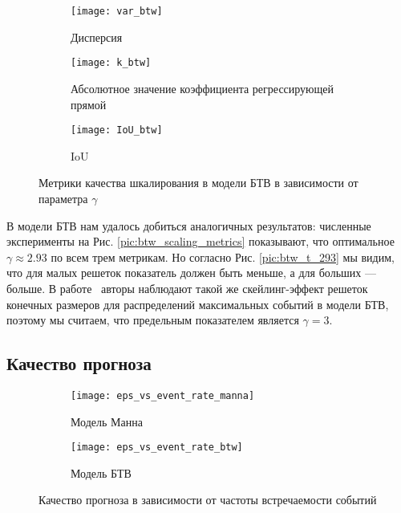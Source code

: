 \begin{figure}[h]
	\centering
	\centering
	\hspace{-25mm}
	\begin{subfigure}[t]{0.27\textwidth}
		\centering
		\texttt{[image: var\_btw]}
		\caption{Дисперсия}
	\end{subfigure}
	\hspace{10mm}
	\begin{subfigure}[t]{0.27\textwidth}
		\centering
		\texttt{[image: k\_btw]}
		\caption{Абсолютное значение коэффициента регрессирующей прямой}
	\end{subfigure}
	\hspace{10mm}
	\begin{subfigure}[t]{0.27\textwidth}
		\centering
		\texttt{[image: IoU\_btw]}
		\caption{IoU}
	\end{subfigure}
	\caption{Метрики качества шкалирования в модели БТВ в зависимости от параметра $\gamma$}\label{pic:btw_scaling_metrics}
\end{figure}

В модели БТВ нам удалось добиться аналогичных результатов: численные эксперименты на Рис. \eqref{pic:btw_scaling_metrics} показывают, что оптимальное $\gamma \approx 2.93$ по всем трем метрикам. Но согласно Рис. \eqref{pic:btw_t_293} мы видим, что для малых решеток показатель должен быть меньше, а для больших --- больше. В работе~\cite{Garber2009} авторы наблюдают такой же скейлинг-эффект решеток конечных размеров для распределений максимальных событий в модели БТВ, поэтому мы считаем, что предельным показателем является $\gamma=3$.

\subsection{Качество прогноза}

\begin{figure}[h]
	\centering
	\begin{subfigure}[t]{0.45\textwidth}
		\centering
		\texttt{[image: eps\_vs\_event\_rate\_manna]}
		\caption{Модель Манна}
		\label{pic:event_rate_manna}
	\end{subfigure}
	\begin{subfigure}[t]{0.45\textwidth}
		\centering
		\texttt{[image: eps\_vs\_event\_rate\_btw]}
		\caption{Модель БТВ}
		\label{pic:event_rate_btw}
	\end{subfigure}
	\caption{Качество прогноза в зависимости от частоты встречаемости событий}\label{pic:event_rate}
\end{figure}


